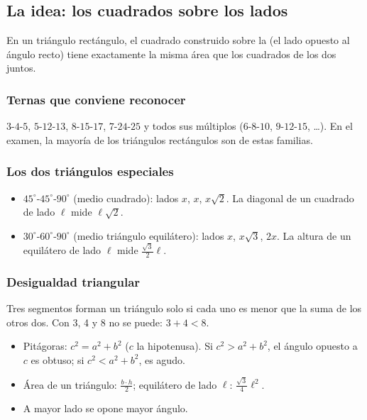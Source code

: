 \bitacora


\subsection{La idea: los cuadrados sobre los lados}
En un triángulo rectángulo, el cuadrado construido sobre la  (el lado opuesto al ángulo recto) tiene
exactamente la misma área que los cuadrados de los dos  juntos.


\subsubsection{Ternas que conviene reconocer}
$3$-$4$-$5$, $5$-$12$-$13$, $8$-$15$-$17$, $7$-$24$-$25$ y todos sus múltiplos ($6$-$8$-$10$, $9$-$12$-$15$, …). En el
examen, la mayoría de los triángulos rectángulos son de estas familias.

\subsubsection{Los dos triángulos especiales}
\begin{itemize}
  \item $45^\circ$-$45^\circ$-$90^\circ$ (medio cuadrado): lados $x$, $x$, $x\sqrt2$. La diagonal de un cuadrado de lado
  $\ell$ mide $\ell\sqrt2$.
  \item $30^\circ$-$60^\circ$-$90^\circ$ (medio triángulo equilátero): lados $x$, $x\sqrt3$, $2x$. La altura de un
  equilátero de lado $\ell$ mide $\tfrac{\sqrt3}{2}\ell$.
\end{itemize}

\subsubsection{Desigualdad triangular}
Tres segmentos forman un triángulo solo si cada uno es menor que la suma de los otros dos. Con 3, 4 y 8 no se puede:
$3 + 4 < 8$.

\begin{regla}
\begin{itemize}
  \item Pitágoras: $c^2 = a^2 + b^2$ ($c$ la hipotenusa). Si $c^2 > a^2 + b^2$, el ángulo opuesto a $c$ es obtuso; si
  $c^2 < a^2 + b^2$, es agudo.
  \item Área de un triángulo: $\tfrac{b\cdot h}{2}$; equilátero de lado $\ell$: $\tfrac{\sqrt3}{4}\ell^2$.
  \item A mayor lado se opone mayor ángulo.
\end{itemize}
\end{regla}

